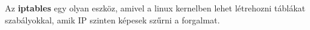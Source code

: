 Az \textbf{iptables} egy olyan eszköz, amivel a linux kernelben lehet létrehozni 
táblákat szabályokkal, amik IP szinten képesek szűrni a forgalmat. 


%
%
%
%

